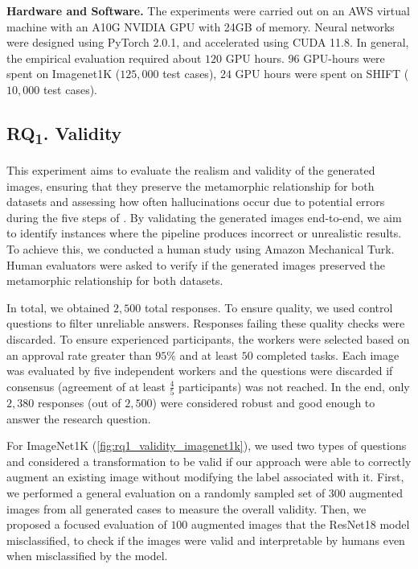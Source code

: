 \noindent\textbf{Hardware and Software.} The experiments were carried out on an AWS virtual machine with an A10G NVIDIA GPU with 24GB of memory. Neural networks were designed using PyTorch 2.0.1, and accelerated using CUDA 11.8.
In general, the empirical evaluation required about $120$ GPU hours.
$96$ GPU-hours were spent on Imagenet1K ($125,000$ test cases), $24$ GPU hours were spent on SHIFT ($10,000$ test cases).

\subsection{RQ\textsubscript{1}. Validity}
\label{sec:experiments:validity}
This experiment aims to evaluate the realism and validity of the generated images, ensuring that they preserve the metamorphic relationship for both datasets and assessing how often hallucinations occur due to potential errors during the five steps of \approach. By validating the generated images end-to-end, we aim to identify instances where the pipeline produces incorrect or unrealistic results.
To achieve this, we conducted a human study using Amazon Mechanical Turk. Human evaluators were asked to verify if the generated images preserved the metamorphic relationship for both datasets.

In total, we obtained $2,500$ total responses. To ensure quality, we used control questions to filter unreliable answers. Responses failing these quality checks were discarded. To ensure experienced participants, the workers were selected based on an approval rate greater than $95\%$ and at least $50$ completed tasks. Each image was evaluated by five independent workers and the questions were discarded if consensus (agreement of at least $\frac{4}{5}$ participants) was not reached. In the end, only $2,380$ responses (out of $2,500$) were considered robust and good enough to answer the research question.


For ImageNet1K (\autoref{fig:rq1_validity_imagenet1k}), we used two types of questions and considered a transformation to be valid if our approach were able to correctly augment an existing image without modifying the label associated with it.
First, we performed a general evaluation on a randomly sampled set of $300$ augmented images from all generated cases to measure the overall validity.
Then, we proposed a focused evaluation of $100$ augmented images that the ResNet18 model misclassified, to check if the images were valid and interpretable by humans even when misclassified by the model.

